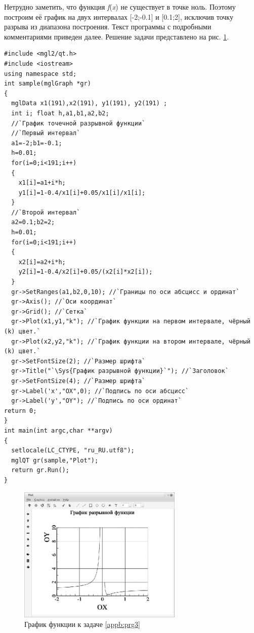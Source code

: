 
Нетрудно заметить, что функция \emph{f}(\emph{x}) не существует в точке ноль. Поэтому
построим её график на двух интервалах [-2;-0.1] и [0.1;2], исключив точку разрыва из диапазона построения. Текст
программы с подробными комментариями приведен далее. Решение задачи представлено на рис. \ref{appb:refDrawing4}.
\begin{lstlisting}
#include <mgl2/qt.h>
#include <iostream>
using namespace std;
int sample(mglGraph *gr)
{  
  mglData x1(191),x2(191), y1(191), y2(191) ;
  int i; float h,a1,b1,a2,b2;
  //`График точечной разрывной функции`
  //`Первый интервал`
  a1=-2;b1=-0.1;
  h=0.01;
  for(i=0;i<191;i++)
  {
    x1[i]=a1+i*h;
    y1[i]=1-0.4/x1[i]+0.05/x1[i]/x1[i];
  }
  //`Второй интервал`
  a2=0.1;b2=2;
  h=0.01;
  for(i=0;i<191;i++)
  {
    x2[i]=a2+i*h;
    y2[i]=1-0.4/x2[i]+0.05/(x2[i]*x2[i]);
  }
  gr->SetRanges(a1,b2,0,10); //`Границы по оси абсцисс и ординат`
  gr->Axis(); //`Оси координат`
  gr->Grid(); //`Сетка`
  gr->Plot(x1,y1,"k"); //`График функции на первом интервале, чёрный (k) цвет.`
  gr->Plot(x2,y2,"k"); //`График функции на втором интервале, чёрный (k) цвет.`
  gr->SetFontSize(2); //`Размер шрифта`
  gr->Title("`\Sys{График разрывной функции}`"); //`Заголовок`
  gr->SetFontSize(4); //`Размер шрифта`
  gr->Label('x',"OX",0); //`Подпись по оси абсцисс`
  gr->Label('y',"OY"); //`Подпись по оси ординат`
return 0;
}
int main(int argc,char **argv)
{
  setlocale(LC_CTYPE, "ru_RU.utf8");
  mglQT gr(sample,"Plot");
  return gr.Run();
}
\end{lstlisting}

\begin{figure}[htb]
\begin{center}
\includegraphics[width=0.7\textwidth]{img/ris_appb_5}
\caption{График функции к задаче \ref{appb:prg3}}
\label{appb:refDrawing4}
\end{center}
\end{figure}

